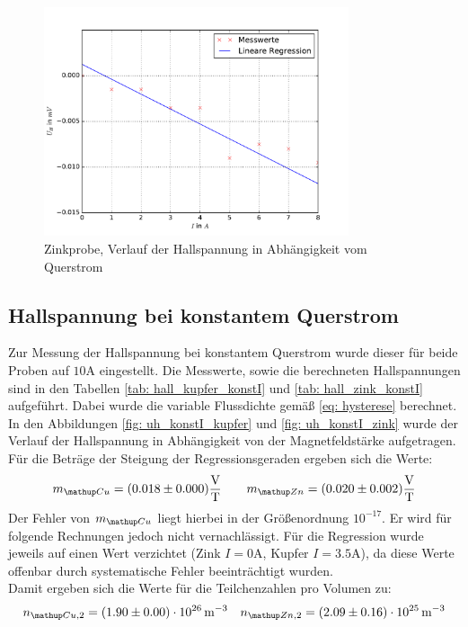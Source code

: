 \begin{figure}
  \centering
  \includegraphics[width=0.8\textwidth]{pics/u_h_zink_konstB.pdf}
  \caption{Zinkprobe, Verlauf der Hallspannung in Abhängigkeit vom Querstrom}
  \label{fig: uh_konstB_zink}
\end{figure}


\subsection{Hallspannung bei konstantem Querstrom}
Zur Messung der Hallspannung bei konstantem Querstrom wurde dieser für beide Proben auf $10\si{\ampere}$ eingestellt. Die%
Messwerte, sowie die berechneten Hallspannungen sind in den Tabellen \ref{tab: hall_kupfer_konstI} und \ref{tab: hall_zink_konstI} aufgeführt. Dabei wurde
die variable Flussdichte gemäß \eqref{eq: hysterese} berechnet. In den Abbildungen \ref{fig: uh_konstI_kupfer} und \ref{fig: uh_konstI_zink}
wurde der Verlauf der Hallspannung in Abhängigkeit von der Magnetfeldstärke aufgetragen. Für die Beträge der Steigung der Regressionsgeraden
ergeben sich die Werte:
\begin{equation}
  m\ua{Cu} = (0.018 \pm 0.000)\si{\volt \per \tesla }  \quad \quad m\ua{Zn} = (0.020 \pm 0.002)\si{\volt \per \tesla}%
  \label{eq: steigung_konst_I}
\end{equation}
Der Fehler von $m\ua{Cu}$ liegt hierbei in der Größenordnung $10^{-17}$. Er wird für folgende Rechnungen jedoch nicht vernachlässigt.
Für die Regression wurde jeweils auf einen Wert verzichtet (Zink $I = 0 \si{\ampere}$, Kupfer $I = 3.5\si{\ampere}$), da diese Werte offenbar
durch systematische Fehler beeinträchtigt wurden.\\
Damit ergeben sich die Werte für die Teilchenzahlen pro Volumen zu:
\begin{equation}
  n\ua{Cu,2} = (1.90 \pm 0.00)\cdot 10^{26}\,\si{ \meter^{-3}} \quad n\ua{Zn,2} = (2.09\pm 0.16)\cdot 10^{25}\,\si{ \meter^{-3}}%
\end{equation}


